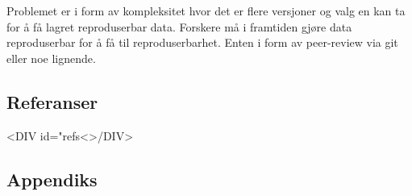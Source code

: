\documentclass[
  norsk,
]{article}
\begin{document}
Problemet er i form av kompleksitet hvor det er flere versjoner og valg
en kan ta for å få lagret reproduserbar data. Forskere må i framtiden
gjøre data reproduserbar for å få til reproduserbarhet. Enten i form av
peer-review via git eller noe lignende.

\hypertarget{referanser}{%
\subsection{Referanser}\label{referanser}}

\textless DIV id="refs\textless\textgreater/DIV\textgreater{}

\hypertarget{appendiks}{%
\subsection{Appendiks}\label{appendiks}}
\end{document}
